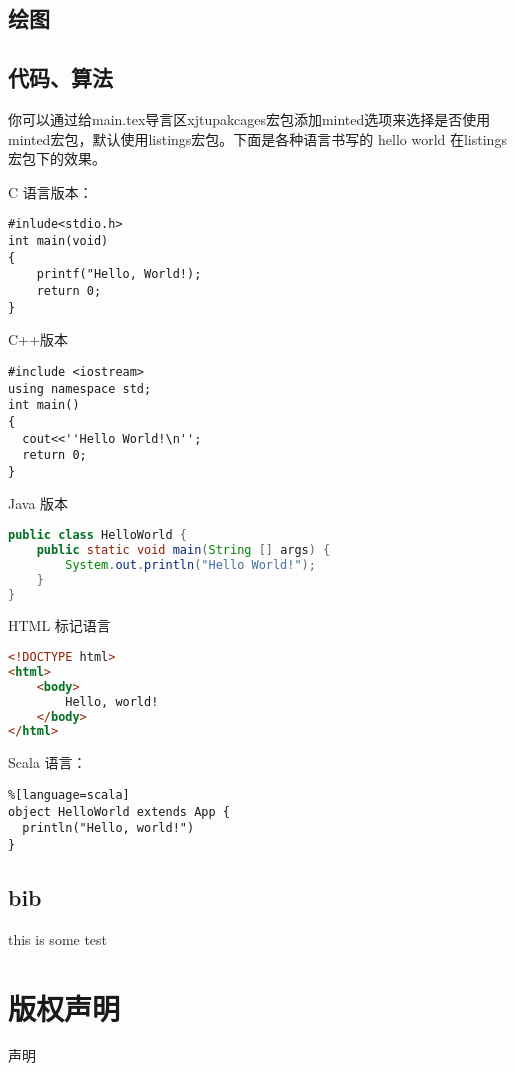 \documentclass[%
               amsthm,
              ]{xjtubsc}
\begin{document}

\subsection{绘图}

\subsection{代码、算法}

你可以通过给main.tex导言区xjtupakcages宏包添加minted选项来选择是否使用minted宏包，默认使用listings宏包。下面是各种语言书写的 hello world 在listings宏包下的效果。

C 语言版本：
\begin{lstlisting}[language={[ANSI]C}]
#inlude<stdio.h>
int main(void)	
{
    printf("Hello, World!);
    return 0;
}
\end{lstlisting}

C++版本
\begin{lstlisting}[language={[ANSI]C++}]
#include <iostream>
using namespace std;
int main()
{
  cout<<''Hello World!\n'';
  return 0;
}
\end{lstlisting}

Java 版本
\begin{lstlisting}[language={java}]
public class HelloWorld {
    public static void main(String [] args) {
        System.out.println("Hello World!");
    }
}
\end{lstlisting}

HTML 标记语言
\begin{lstlisting}[language=html]
<!DOCTYPE html>
<html>
    <body>
        Hello, world!
    </body>
</html>
\end{lstlisting}

Scala  语言：
\begin{lstlisting}%[language=scala]
object HelloWorld extends App {
  println("Hello, world!")
}
\end{lstlisting}

\subsection{bib}

this is some test\cite{IEEE-1363,Krasnogor2004e}
\section{版权声明}
声明
\end{document}
